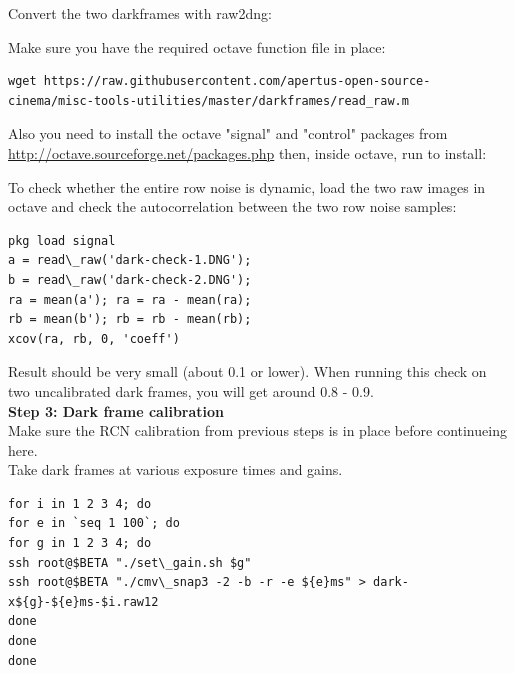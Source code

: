 Convert the two darkframes with raw2dng: \\


Make sure you have the required octave function file in place:\\ 

\begin{lstlisting}[breaklines=true, breakatwhitespace=true]
wget https://raw.githubusercontent.com/apertus-open-source-cinema/misc-tools-utilities/master/darkframes/read_raw.m
\end{lstlisting} 

Also you need to install the octave "signal" and "control" packages from \href{http://octave.sourceforge.net/packages.php}{http://octave.sourceforge.net/packages.php} then, inside octave, run to install:\\


To check whether the entire row noise is dynamic, load the two raw images in octave and check the autocorrelation between the two row noise samples: \\

\begin{lstlisting}[breaklines=true, breakatwhitespace=true]
pkg load signal
a = read\_raw('dark-check-1.DNG');
b = read\_raw('dark-check-2.DNG');
ra = mean(a'); ra = ra - mean(ra);
rb = mean(b'); rb = rb - mean(rb);
xcov(ra, rb, 0, 'coeff')
\end{lstlisting} 

Result should be very small (about 0.1 or lower). When running this check on two uncalibrated dark frames, you will get around 0.8 - 0.9.\\

\textbf{Step 3: Dark frame calibration}\\

Make sure the RCN calibration from previous steps is in place before continueing here.\\

Take dark frames at various exposure times and gains.\\

\begin{lstlisting}[breaklines=true, breakatwhitespace=true]
for i in 1 2 3 4; do
for e in `seq 1 100`; do
for g in 1 2 3 4; do
ssh root@$BETA "./set\_gain.sh $g"
ssh root@$BETA "./cmv\_snap3 -2 -b -r -e ${e}ms" > dark-x${g}-${e}ms-$i.raw12
done
done
done
\end{lstlisting} 

